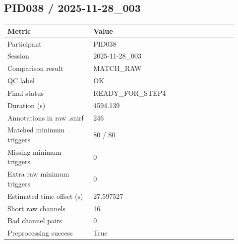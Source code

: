 \subsection*{PID038 / 2025-11-28\_003}
\begin{tabular}{p{0.34\linewidth}p{0.58\linewidth}}
\toprule
Metric & Value\\
\midrule
Participant & PID038\\
Session & 2025-11-28\_003\\
Comparison result & MATCH\_RAW\\
QC label & OK\\
Final status & READY\_FOR\_STEP4\\
Duration (s) & 4594.139\\
Annotations in raw .snirf & 246\\
Matched minimum triggers & 80 / 80\\
Missing minimum triggers & 0\\
Extra raw minimum triggers & 0\\
Estimated time offset (s) & 27.597527\\
Short raw channels & 16\\
Bad channel pairs & 0\\
Preprocessing success & True\\
\bottomrule
\end{tabular}
